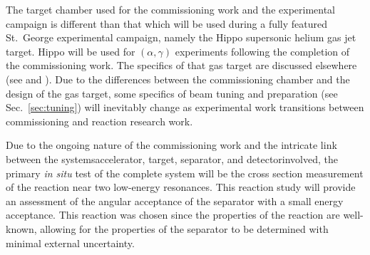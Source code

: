 The target chamber used for the commissioning work and the experimental
campaign is different than that which will be used during a fully
featured St.\ George experimental campaign, namely the Hippo supersonic
helium gas jet target. Hippo will be used for $(\alpha,\gamma)$
experiments following the completion of the commissioning work. The
specifics of that gas target are discussed elsewhere (see
\cite{Kontos2012} and \cite{Meisel2016}). Due to the differences between
the commissioning chamber and the design of the gas target, some
specifics of beam tuning and preparation (see Sec.~\ref{sec:tuning})
will inevitably change as experimental work transitions between
commissioning and reaction research work.

Due to the ongoing nature of the commissioning work and the intricate
link between the systems\textemdash{}accelerator, target, separator, and
detector\textemdash{}involved, the primary \textit{in situ} test of the
complete system will be the cross section measurement of the \alpa{}
reaction near two low-energy resonances. This reaction study will
provide an assessment of the angular acceptance of the separator with a
small energy acceptance. This reaction was chosen since the properties
of the reaction are well-known, allowing for the properties of the
separator to be determined with minimal external uncertainty.
